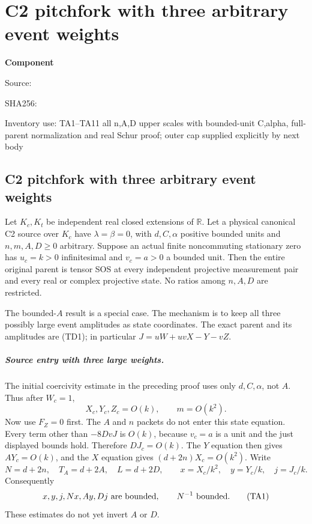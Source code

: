 \chapter{C2 pitchfork with three arbitrary event weights}
\label{component:p6c62a53b1454}
\noindent\textbf{Component }\par
{\small\noindent Source: \par}
{\small\noindent SHA256: \par}
{\small\noindent Inventory use: TA1--TA11 all n,A,D upper scales with bounded-unit C,alpha, full-parent normalization and real Schur proof; outer cap supplied explicitly by next body\par}
\medskip
\section{C2 pitchfork with three arbitrary event weights}
\label{p6c62a53b1454:sec:c2-three-large}

\begin{theorem}
\label{p6c62a53b1454:thm:c2-three-large}
Let $K_c,K_t$ be independent real closed extensions of $\mathbb R$.
Let a physical canonical C2 source over $K_c$ have $\lambda=\beta=0$,
with $d,C,\alpha$ positive bounded units and
$n,m,A,D\geq0$ arbitrary. Suppose an actual finite noncommuting
stationary zero has $u_c=k>0$ infinitesimal and $v_c=a>0$ a bounded
unit. Then the entire original parent is tensor SOS at every
independent projective measurement pair and every real or complex
projective state. No ratios among $n,A,D$ are restricted.
\end{theorem}

The bounded-$A$ result is a special case. The mechanism is to keep
all three possibly large event amplitudes as state coordinates.
The exact parent and its amplitudes are (TD1); in particular
$J=uW+uvX-Y-vZ$.

\paragraph{Source entry with three large weights.}
The initial coercivity estimate in the preceding proof uses only
$d,C,\alpha$, not $A$. Thus after $W_c=1$,
\[
 X_c,Y_c,Z_c=O(k),\qquad m=O(k^2).
\]
Now use $F_Z=0$ first. The $A$ and $n$ packets do not enter this
state equation. Every term other than $-8DvJ$ is $O(k)$, because
$v_c=a$ is a unit and the just displayed bounds hold. Therefore
$DJ_c=O(k)$. The $Y$ equation then gives $AY_c=O(k)$, and the $X$
equation gives $(d+2n)X_c=O(k^2)$. Write
\[
 N=d+2n,\quad T_A=d+2A,\quad L=d+2D,\qquad
 x=X_c/k^2,\quad y=Y_c/k,\quad j=J_c/k.
\]
Consequently
\[
 x,y,j,Nx,Ay,Dj\ \hbox{are bounded},\qquad N^{-1}\ \hbox{bounded}.
                                                               \tag{TA1}
\]
These estimates do not yet invert $A$ or $D$.

